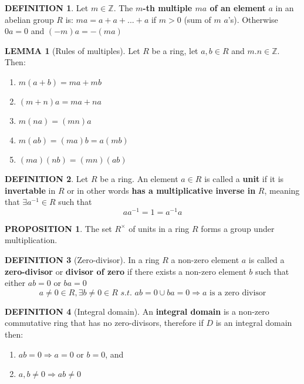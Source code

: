 \documentclass[12pt]{article}
\theoremstyle{definition}
\newtheorem{definition}{DEFINITION}[subsection]
\newcommand{\suchthat}{\textit{ s.t. }}
\newtheorem{lemma}{LEMMA}[subsection]
\newtheorem{prop}{PROPOSITION}[subsection]
\begin{document}
\begin{definition}
    Let $m \in \mathbb{Z}$. The \textbf{$m$-th multiple $ma$ of an element} $a$ in an abelian group $R$ is:
    $ma = a + a +... + a$ if $m > 0$ (sum of $m$ $a$'s). Otherwise $0a = 0$ and $(-m)a = -(ma)$
\end{definition}

\begin{lemma}[Rules of multiples]
    Let $R$ be a ring, let $a,b\in R$ and $m.n \in \mathbb{Z}$. Then:
    \begin{enumerate}
        \item $m(a+b) = ma + mb$
        \item $(m+n)a = ma + na$
        \item $m(na) = (mn)a$
        \item $m(ab) = (ma)b = a(mb)$
        \item $(ma)(nb) = (mn)(ab)$
    \end{enumerate}
\end{lemma}

\begin{definition}
    Let $R$ be a ring. An element $a \in R$ is called a \textbf{unit} if it is \textbf{invertable} in $R$ or in other words \textbf{has a multiplicative inverse in} $R$, meaning that $\exists a^{-1} \in R$ such that $$aa^{-1} = 1 = a^{-1}a$$
\end{definition}

\begin{prop}
    The set $R^{\times}$ of units in a ring $R$ forms a group under multiplication.
\end{prop}

\begin{definition}[Zero-divisor]
    In a ring $R$ a non-zero element $a$ is called a \textbf{zero-divisor} or \textbf{divisor of zero} if there exists a non-zero element $b$ such that either $ab = 0$ or $ba = 0$
    $${a \neq 0 \in R, \exists b \neq 0 \in R \suchthat ab = 0 \cup ba = 0} \Rightarrow {a\text{ is a zero divisor}}$$
\end{definition}

\begin{definition}[Integral domain]
    An \textbf{integral domain} is a non-zero commutative ring that has no zero-divisors, therefore if $D$ is an integral domain then:
    \begin{enumerate}
        \item $ab = 0 \Rightarrow  a = 0$ or $b = 0$, and
        \item $a,b\neq 0 \Rightarrow ab \neq 0$
    \end{enumerate}
\end{definition}
\end{document}
